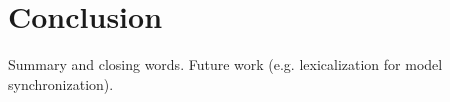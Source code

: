 \documentclass[]{report}
\begin{document}
\section{Conclusion}
Summary and closing words. Future work (e.g. lexicalization for model synchronization).




\end{document}
